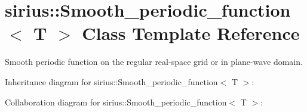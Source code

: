 \hypertarget{classsirius_1_1_smooth__periodic__function}{}\section{sirius\+:\+:Smooth\+\_\+periodic\+\_\+function$<$ T $>$ Class Template Reference}
\label{classsirius_1_1_smooth__periodic__function}


Smooth periodic function on the regular real-\/space grid or in plane-\/wave domain.  




Inheritance diagram for sirius\+:\+:Smooth\+\_\+periodic\+\_\+function$<$ T $>$\+:


Collaboration diagram for sirius\+:\+:Smooth\+\_\+periodic\+\_\+function$<$ T $>$\+:
